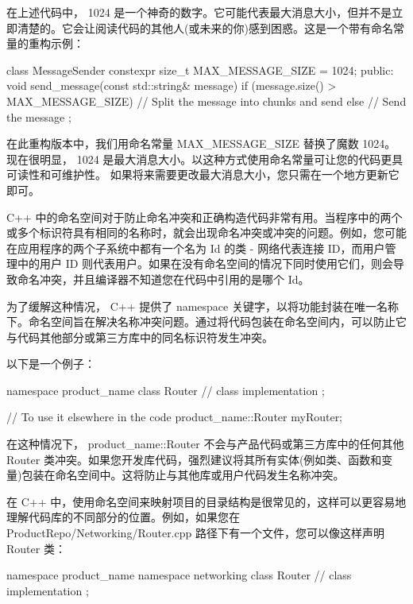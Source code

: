 在上述代码中， 1024 是一个神奇的数字。它可能代表最大消息大小，但并不是立即清楚的。它会让阅读代码的其他人(或未来的你)感到困惑。这是一个带有命名常量的重构示例：

\begin{cpp}
class MessageSender {
    constexpr size_t MAX_MESSAGE_SIZE = 1024;
public:
    void send_message(const std::string& message) {
        if (message.size() > MAX_MESSAGE_SIZE) {
            // Split the message into chunks and send
        } else {
            // Send the message
        }
    }
};
\end{cpp}

在此重构版本中，我们用命名常量 MAX\_MESSAGE\_SIZE 替换了魔数 1024。现在很明显， 1024 是最大消息大小。以这种方式使用命名常量可让您的代码更具可读性和可维护性。
如果将来需要更改最大消息大小，您只需在一个地方更新它即可。


C++ 中的命名空间对于防止命名冲突和正确构造代码非常有用。当程序中的两个或多个标识符具有相同的名称时，就会出现命名冲突或冲突的问题。例如，您可能在应用程序的两个子系统中都有一个名为 Id 的类 - 网络代表连接 ID，而用户管理中的用户 ID 则代表用户。如果在没有命名空间的情况下同时使用它们，则会导致命名冲突，并且编译器不知道您在代码中引用的是哪个 Id。

为了缓解这种情况， C++ 提供了 namespace 关键字，以将功能封装在唯一名称下。命名空间旨在解决名称冲突问题。通过将代码包装在命名空间内，可以防止它与代码其他部分或第三方库中的同名标识符发生冲突。

以下是一个例子：

\begin{cpp}
namespace product_name {
    class Router {
        // class implementation
    };
}

// To use it elsewhere in the code
product_name::Router myRouter;
\end{cpp}

在这种情况下， product\_name::Router 不会与产品代码或第三方库中的任何其他 Router 类冲突。如果您开发库代码，强烈建议将其所有实体(例如类、函数和变量)包装在命名空间中。这将防止与其他库或用户代码发生名称冲突。

在 C++ 中，使用命名空间来映射项目的目录结构是很常见的，这样可以更容易地理解代码库的不同部分的位置。例如，如果您在 ProductRepo/Networking/Router.cpp 路径下有一个文件，您可以像这样声明 Router 类：

\begin{cpp}
namespace product_name {
    namespace networking {
        class Router {
            // class implementation
        };
    }
}
\end{cpp}

